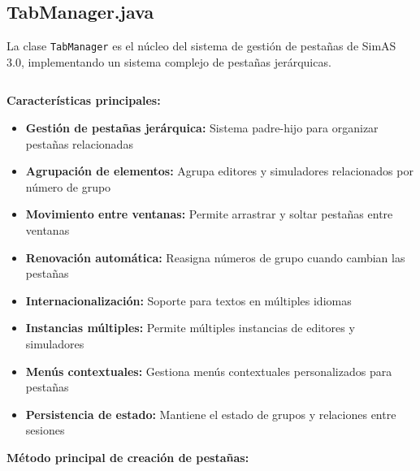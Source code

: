 \subsection{TabManager.java}

La clase \texttt{TabManager} es el núcleo del sistema de gestión de pestañas de SimAS 3.0, implementando un sistema complejo de pestañas jerárquicas.

\inputminted[linenos,breaklines,firstline=1,lastline=100]{java}{codigo/src/utils/TabManager.java}

\textbf{Características principales:}

\begin{itemize}
    \item \textbf{Gestión de pestañas jerárquica:} Sistema padre-hijo para organizar pestañas relacionadas
    \item \textbf{Agrupación de elementos:} Agrupa editores y simuladores relacionados por número de grupo
    \item \textbf{Movimiento entre ventanas:} Permite arrastrar y soltar pestañas entre ventanas
    \item \textbf{Renovación automática:} Reasigna números de grupo cuando cambian las pestañas
    \item \textbf{Internacionalización:} Soporte para textos en múltiples idiomas
    \item \textbf{Instancias múltiples:} Permite múltiples instancias de editores y simuladores
    \item \textbf{Menús contextuales:} Gestiona menús contextuales personalizados para pestañas
    \item \textbf{Persistencia de estado:} Mantiene el estado de grupos y relaciones entre sesiones
\end{itemize}

\textbf{Método principal de creación de pestañas:}

